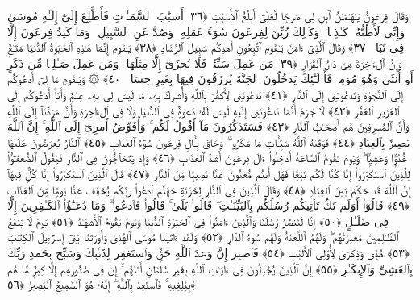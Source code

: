  وَقَالَ فِرعَونُ يَـٰهَـٰمَـٰنُ ٱبنِ لِى صَرحًۭا لَّعَلِّىٓ أَبلُغُ ٱلأَسبَٰبَ ﴿٣٦﴾
 أَسبَٰبَ ٱلسَّمَـٰوَٟتِ فَأَطَّلِعَ إِلَىٰٓ إِلَـٰهِ مُوسَىٰ وَإِنِّى لَأَظُنُّهُۥ كَـٰذِبًۭا ۚ وَكَذَٟلِكَ زُيِّنَ لِفِرعَونَ سُوٓءُ عَمَلِهِۦ وَصُدَّ عَنِ ٱلسَّبِيلِ ۚ وَمَا كَيدُ فِرعَونَ إِلَّا فِى تَبَابٍۢ ﴿٣٧﴾
 وَقَالَ ٱلَّذِىٓ ءَامَنَ يَـٰقَومِ ٱتَّبِعُونِ أَهدِكُم سَبِيلَ ٱلرَّشَادِ ﴿٣٨﴾
 يَـٰقَومِ إِنَّمَا هَـٰذِهِ ٱلحَيَوٰةُ ٱلدُّنيَا مَتَـٰعٌۭ وَإِنَّ ٱلءَاخِرَةَ هِىَ دَارُ ٱلقَرَارِ ﴿٣٩﴾
 مَن عَمِلَ سَيِّئَةًۭ فَلَا يُجزَىٰٓ إِلَّا مِثلَهَا ۖ وَمَن عَمِلَ صَـٰلِحًۭا مِّن ذَكَرٍ أَو أُنثَىٰ وَهُوَ مُؤمِنٌۭ فَأُو۟لَـٰٓئِكَ يَدخُلُونَ ٱلجَنَّةَ يُرزَقُونَ فِيهَا بِغَيرِ حِسَابٍۢ ﴿٤٠﴾
 ۞ وَيَـٰقَومِ مَا لِىٓ أَدعُوكُم إِلَى ٱلنَّجَوٰةِ وَتَدعُونَنِىٓ إِلَى ٱلنَّارِ ﴿٤١﴾
 تَدعُونَنِى لِأَكفُرَ بِٱللَّهِ وَأُشرِكَ بِهِۦ مَا لَيسَ لِى بِهِۦ عِلمٌۭ وَأَنَا۠ أَدعُوكُم إِلَى ٱلعَزِيزِ ٱلغَفَّٰرِ ﴿٤٢﴾
 لَا جَرَمَ أَنَّمَا تَدعُونَنِىٓ إِلَيهِ لَيسَ لَهُۥ دَعوَةٌۭ فِى ٱلدُّنيَا وَلَا فِى ٱلءَاخِرَةِ وَأَنَّ مَرَدَّنَآ إِلَى ٱللَّهِ وَأَنَّ ٱلمُسرِفِينَ هُم أَصحَـٰبُ ٱلنَّارِ ﴿٤٣﴾
 فَسَتَذكُرُونَ مَآ أَقُولُ لَكُم ۚ وَأُفَوِّضُ أَمرِىٓ إِلَى ٱللَّهِ ۚ إِنَّ ٱللَّهَ بَصِيرٌۢ بِٱلعِبَادِ ﴿٤٤﴾
 فَوَقَىٰهُ ٱللَّهُ سَيِّـَٔاتِ مَا مَكَرُوا۟ ۖ وَحَاقَ بِـَٔالِ فِرعَونَ سُوٓءُ ٱلعَذَابِ ﴿٤٥﴾
 ٱلنَّارُ يُعرَضُونَ عَلَيهَا غُدُوًّۭا وَعَشِيًّۭا ۖ وَيَومَ تَقُومُ ٱلسَّاعَةُ أَدخِلُوٓا۟ ءَالَ فِرعَونَ أَشَدَّ ٱلعَذَابِ ﴿٤٦﴾
 وَإِذ يَتَحَآجُّونَ فِى ٱلنَّارِ فَيَقُولُ ٱلضُّعَفَـٰٓؤُا۟ لِلَّذِينَ ٱستَكبَرُوٓا۟ إِنَّا كُنَّا لَكُم تَبَعًۭا فَهَل أَنتُم مُّغنُونَ عَنَّا نَصِيبًۭا مِّنَ ٱلنَّارِ ﴿٤٧﴾
 قَالَ ٱلَّذِينَ ٱستَكبَرُوٓا۟ إِنَّا كُلٌّۭ فِيهَآ إِنَّ ٱللَّهَ قَد حَكَمَ بَينَ ٱلعِبَادِ ﴿٤٨﴾
 وَقَالَ ٱلَّذِينَ فِى ٱلنَّارِ لِخَزَنَةِ جَهَنَّمَ ٱدعُوا۟ رَبَّكُم يُخَفِّف عَنَّا يَومًۭا مِّنَ ٱلعَذَابِ ﴿٤٩﴾
 قَالُوٓا۟ أَوَلَم تَكُ تَأتِيكُم رُسُلُكُم بِٱلبَيِّنَـٰتِ ۖ قَالُوا۟ بَلَىٰ ۚ قَالُوا۟ فَٱدعُوا۟ ۗ وَمَا دُعَـٰٓؤُا۟ ٱلكَـٰفِرِينَ إِلَّا فِى ضَلَـٰلٍ ﴿٥٠﴾
 إِنَّا لَنَنصُرُ رُسُلَنَا وَٱلَّذِينَ ءَامَنُوا۟ فِى ٱلحَيَوٰةِ ٱلدُّنيَا وَيَومَ يَقُومُ ٱلأَشهَـٰدُ ﴿٥١﴾
 يَومَ لَا يَنفَعُ ٱلظَّـٰلِمِينَ مَعذِرَتُهُم ۖ وَلَهُمُ ٱللَّعنَةُ وَلَهُم سُوٓءُ ٱلدَّارِ ﴿٥٢﴾
 وَلَقَد ءَاتَينَا مُوسَى ٱلهُدَىٰ وَأَورَثنَا بَنِىٓ إِسرَٰٓءِيلَ ٱلكِتَـٰبَ ﴿٥٣﴾
 هُدًۭى وَذِكرَىٰ لِأُو۟لِى ٱلأَلبَٰبِ ﴿٥٤﴾
 فَٱصبِر إِنَّ وَعدَ ٱللَّهِ حَقٌّۭ وَٱستَغفِر لِذَنۢبِكَ وَسَبِّح بِحَمدِ رَبِّكَ بِٱلعَشِىِّ وَٱلإِبكَـٰرِ ﴿٥٥﴾
 إِنَّ ٱلَّذِينَ يُجَٰدِلُونَ فِىٓ ءَايَـٰتِ ٱللَّهِ بِغَيرِ سُلطَٰنٍ أَتَىٰهُم ۙ إِن فِى صُدُورِهِم إِلَّا كِبرٌۭ مَّا هُم بِبَٰلِغِيهِ ۚ فَٱستَعِذ بِٱللَّهِ ۖ إِنَّهُۥ هُوَ ٱلسَّمِيعُ ٱلبَصِيرُ ﴿٥٦﴾
